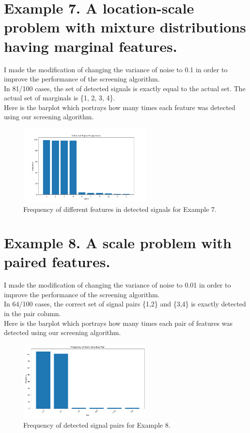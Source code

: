 \documentclass[12pt]{article}
\begin{document}
\section{Example 7. A location-scale problem with mixture distributions having marginal features.}
I made the modification of changing the variance of noise to 0.1 in order to improve the performance of the screening algorithm.\\
In 81/100 cases, the set of detected signals is exactly equal to the actual set. The actual set of marginals is \{1, 2, 3, 4\}.\\
Here is the barplot which portrays how many times each feature was detected using our screening algorithm.
\begin{figure}[H]
    \centering
    \includegraphics[width=0.6\textwidth]{eg7.png}
    \caption{Frequency of different features in detected signals for Example 7.}
\end{figure}

\section{Example 8. A scale problem with paired features.}
I made the modification of changing the variance of noise to 0.01 in order to improve the performance of the screening algorithm.\\
In 64/100 cases, the correct set of signal pairs \{1,2\} and \{3,4\} is exactly detected in the pair column. \\
Here is the barplot which portrays how many times each pair of features was detected using our screening algorithm.
\begin{figure}[H]
    \centering
    \includegraphics[width=0.6\textwidth]{eg8.png}
    \caption{Frequency of detected signal pairs for Example 8.}
\end{figure}
\end{document}

